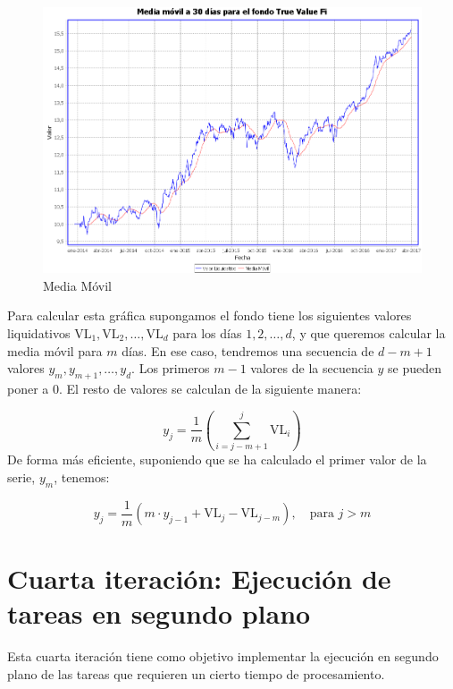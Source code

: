 \documentclass[12pt, a4paper]{book}
\begin{document}
	\begin{figure}[htbp]
	\centering
	\includegraphics[width=\textwidth]{figuras/media.PNG}
	\caption{Media Móvil}
	\label{fig:media}
	\end {figure}
	
	Para calcular esta gráfica supongamos el fondo tiene los siguientes valores liquidativos $\text{VL}_1,\text{VL}_2,\ldots,\text{VL}_d$ para los días $1,2,\ldots,d$, y que queremos calcular la media móvil para $m$ días. En ese caso, tendremos una secuencia de $d-m+1$ valores $y_m,y_{m+1},\ldots,y_d$. Los primeros $m-1$ valores de la secuencia $y$ se pueden poner a $0$. El resto de valores se calculan de la siguiente manera:
	
	\begin{equation}
	y_j=\frac{1}{m}\left(\sum_{i=j-m+1}^{j}\text{VL}_i\right)
	\end{equation}
	De forma más eficiente, suponiendo que se ha calculado el primer valor de la serie, $y_m$, tenemos:
	
	\begin{equation}
	y_{j}=\frac{1}{m}\left(m\cdot y_{j-1}+\text{VL}_j-\text{VL}_{j-m}\right),\quad\text{para }j>m
	\end{equation}

\newpage

\section{Cuarta iteración: Ejecución de tareas en segundo plano}

Esta cuarta iteración tiene como objetivo implementar la ejecución en segundo plano de las tareas que requieren un cierto tiempo de procesamiento.\\
\end{document}
